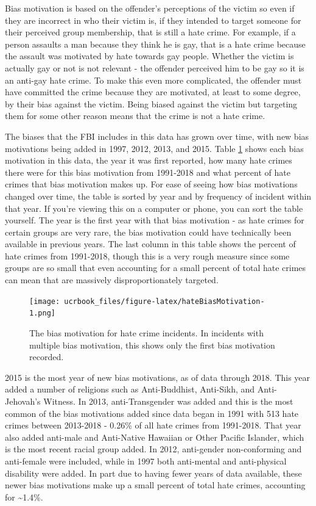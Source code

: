 \documentclass[
  12pt,
  openany]{book}
\begin{document}
Bias motivation is based on the offender's perceptions of the victim so even if they are incorrect in who their victim is, if they intended to target someone for their perceived group membership, that is still a hate crime. For example, if a person assaults a man because they think he is gay, that is a hate crime because the assault was motivated by hate towards gay people. Whether the victim is actually gay or not is not relevant - the offender perceived him to be gay so it is an anti-gay hate crime. To make this even more complicated, the offender must have committed the crime because they are motivated, at least to some degree, by their bias against the victim. Being biased against the victim but targeting them for some other reason means that the crime is not a hate crime.

The biases that the FBI includes in this data has grown over time, with new bias motivations being added in 1997, 2012, 2013, and 2015. Table \ref{fig:hateBiasMotivation} shows each bias motivation in this data, the year it was first reported, how many hate crimes there were for this bias motivation from 1991-2018 and what percent of hate crimes that bias motivation makes up. For ease of seeing how bias motivations changed over time, the table is sorted by year and by frequency of incident within that year. If you're viewing this on a computer or phone, you can sort the table yourself. The year is the first year with that bias motivation - as hate crimes for certain groups are very rare, the bias motivation could have technically been available in previous years. The last column in this table shows the percent of hate crimes from 1991-2018, though this is a very rough measure since some groups are so small that even accounting for a small percent of total hate crimes can mean that are massively disproportionately targeted.

\begin{figure}
\centering
\texttt{[image: ucrbook\_files/figure-latex/hateBiasMotivation-1.png]}
\caption{\label{fig:hateBiasMotivation}The bias motivation for hate crime incidents. In incidents with multiple bias motivation, this shows only the first bias motivation recorded.}
\end{figure}

2015 is the most year of new bias motivations, as of data through 2018. This year added a number of religions such as Anti-Buddhist, Anti-Sikh, and Anti-Jehovah's Witness. In 2013, anti-Transgender was added and this is the most common of the bias motivations added since data began in 1991 with 513 hate crimes between 2013-2018 - 0.26\% of all hate crimes from 1991-2018. That year also added anti-male and Anti-Native Hawaiian or Other Pacific Islander, which is the most recent racial group added. In 2012, anti-gender non-conforming and anti-female were included, while in 1997 both anti-mental and anti-physical disability were added. In part due to having fewer years of data available, these newer bias motivations make up a small percent of total hate crimes, accounting for \textasciitilde1.4\%.
\end{document}
